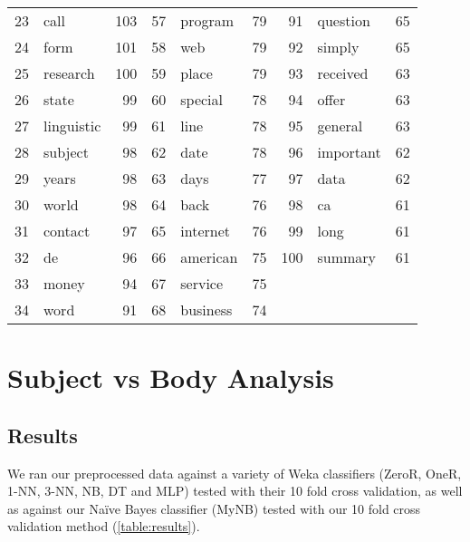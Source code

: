 \documentclass[10pt, a4paper]{article}
\begin{document}
\begin{table}[H]
\begin{tabular}{@{}rlrrlrrlr@{}}
23 & call & 103 & 57 & program & 79 & 91 & question & 65 \\
24 & form & 101 & 58 & web & 79 & 92 & simply & 65 \\
25 & research & 100 & 59 & place & 79 & 93 & received & 63 \\
26 & state & 99 & 60 & special & 78 & 94 & offer & 63 \\
27 & linguistic & 99 & 61 & line & 78 & 95 & general & 63 \\
28 & subject & 98 & 62 & date & 78 & 96 & important & 62 \\
29 & years & 98 & 63 & days & 77 & 97 & data & 62 \\
30 & world & 98 & 64 & back & 76 & 98 & ca & 61 \\
31 & contact & 97 & 65 & internet & 76 & 99 & long & 61 \\
32 & de & 96 & 66 & american & 75 & 100 & summary & 61 \\
33 & money & 94 & 67 & service & 75 &  &  &  \\
34 & word & 91 & 68 & business & 74 &  &  &  \\
\bottomrule
\end{tabular}
\label{table:bodycorpus}
\end{table}

\section{Subject vs Body Analysis}

\subsection{Results}

We ran our preprocessed data against a variety of Weka classifiers (ZeroR, OneR, 1-NN, 3-NN, NB, DT and MLP) tested with their 10 fold cross validation, as well as against our Na\"ive Bayes classifier (MyNB) tested with our 10 fold cross validation method (\autoref{table:results}).

\end{document}
